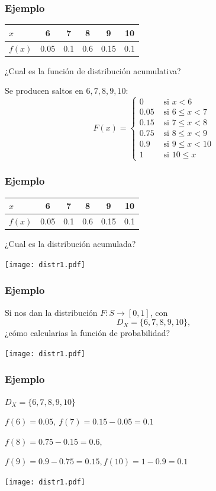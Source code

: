 \begin{frame}
\frametitle{Ejemplo}
\begin{center}
\begin{tabular}{l|ccccc}
$x$ & 6 & 7 & 8 & 9 & 10\\
\hline
$f(x)$ &  0.05 & 0.1 & 0.6 & 0.15 &  0.1
\end{tabular}
\end{center}
¿Cual es la función de distribución acumulativa?
\medskip

Se producen saltos en  $6, 7, 8, 9, 10$:
$$
F(x)=\left\{
\begin{array}{ll}
0 & \mbox{ si $x<6$}\\
0.05 & \mbox{ si $6\leq x< 7$}\\
0.15 & \mbox{ si $7\leq x< 8$}\\
0.75 & \mbox{ si $8\leq x< 9$}\\
0.9 & \mbox{ si $9\leq x< 10$}\\
1 & \mbox{ si $10\leq x$}
\end{array}\right.
$$


\end{frame}

\begin{frame}
\frametitle{Ejemplo}
\begin{center}
\begin{tabular}{l|ccccc}
$x$ & 6 & 7 & 8 & 9 & 10\\
\hline
$f(x)$ &  0.05 & 0.1 & 0.6 & 0.15 &  0.1
\end{tabular}
\end{center}
¿Cual es la distribución acumulada?
\vspace*{-5ex}
\begin{center}
\texttt{[image: distr1.pdf]}
\end{center}

\end{frame}


\begin{frame}
\frametitle{Ejemplo}
Si nos dan la distribución $F:S\to [0,1]$, con 
$$
D_X=\{6,7,8,9,10\},
$$
 ¿cómo calcularias la función de probabilidad?
\vspace*{-5ex}

\begin{center}
\texttt{[image: distr1.pdf]}
\end{center}

\end{frame}


\begin{frame}
\frametitle{Ejemplo}
$D_X=\{6,7,8,9,10\}$
\medskip

$f(6)=0.05,\ f(7)=0.15-0.05=0.1$

$f(8)=0.75-0.15=0.6,$

$f(9)=0.9-0.75=0.15, f(10)=1-0.9=0.1$
\vspace*{-5ex}

\begin{center}
\texttt{[image: distr1.pdf]}
\end{center}

\end{frame}


